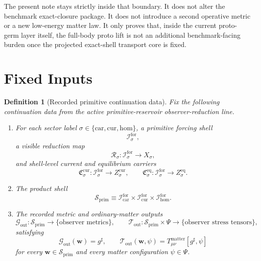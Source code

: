 \documentclass[11pt]{article}
\newcommand{\CompletedMetric}{g^{\sharp}}
\newcommand{\MatterSpace}{\Psi}
\newcommand{\Car}{\mathrm{car}}
\newcommand{\Cur}{\mathrm{cur}}
\newcommand{\Hom}{\mathrm{hom}}
\newcommand{\ForSpace}[1]{\mathcal I_{#1}^{\mathrm{for}}}
\newcommand{\PrimShell}{\mathcal S_{\mathrm{prim}}}
\newcommand{\Reduction}[1]{\mathcal R_{#1}}
\newcommand{\CurrentCarrier}[1]{\mathfrak C_{#1}^{\mathrm{cur}}}
\newcommand{\EqCarrier}[1]{\mathfrak C_{#1}^{\mathrm{eq}}}
\newcommand{\MetricOut}{\mathscr G_{\mathrm{out}}}
\newcommand{\MatterOut}{\mathscr T_{\mathrm{out}}}
\newtheorem{definition}{Definition}
\begin{document}
The present note stays strictly inside that boundary. It does not alter the benchmark exact-closure package. It does not introduce a second operative metric or a new low-energy matter law. It only proves that, inside the current proto-germ layer itself, the full-body proto lift is not an additional benchmark-facing burden once the projected exact-shell transport core is fixed.

\section{Fixed Inputs}

\begin{definition}[Recorded primitive continuation data]
\label{def:fixed}
Fix the following continuation data from the active primitive-reservoir observer-reduction line.
\begin{enumerate}
    \item For each sector label \(\sigma\in\{\Car,\Cur,\Hom\}\), a primitive forcing shell
    \[
    \ForSpace{\sigma},
    \]
    a visible reduction map
    \[
    \Reduction{\sigma}:\ForSpace{\sigma}\to X_{\sigma},
    \]
    and shell-level current and equilibrium carriers
    \[
    \CurrentCarrier{\sigma}:\ForSpace{\sigma}\to Z_{\sigma}^{\mathrm{cur}},
    \qquad
    \EqCarrier{\sigma}:\ForSpace{\sigma}\to Z_{\sigma}^{\mathrm{eq}}.
    \]
    \item The product shell
    \[
    \PrimShell
    \equiv
    \ForSpace{\Car}\times \ForSpace{\Cur}\times \ForSpace{\Hom}.
    \]
    \item The recorded metric and ordinary-matter outputs
    \[
    \MetricOut:\PrimShell\to\{\text{observer metrics}\},
    \qquad
    \MatterOut:\PrimShell\times\MatterSpace\to\{\text{observer stress tensors}\},
    \]
    satisfying
    \begin{equation}
    \MetricOut(\mathbf w)=\CompletedMetric,
    \qquad
    \MatterOut(\mathbf w,\psi)
    =
    T_{\mu\nu}^{\mathrm{matter}}[\CompletedMetric,\psi]
    \label{eq:fixedoutputs}
    \end{equation}
    for every \(\mathbf w\in\PrimShell\) and every matter configuration \(\psi\in\MatterSpace\).
\end{enumerate}
\end{definition}
\end{document}

